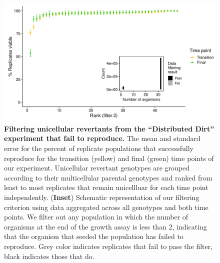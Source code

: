 \documentclass[
]{book}
\begin{document}
\begin{figure}
\centering
\includegraphics{images/Figure_S12_Dist_dirt_Populations_that_fail_to_divide_NEW_14MAR23.png}
\caption{\label{fig:dd-filter-2-failure-to-divide}\textbf{Filtering unicellular revertants from the ``Distributed Dirt'' experiment that fail to reproduce.} The mean and standard error for the percent of replicate populations that successfully reproduce for the transition (yellow) and final (green) time points of our experiment. Unicellular revertant genotypes are grouped according to their multicellular parental genotypes and ranked from least to most replicates that remain unicellluar for each time point independently. (\textbf{Inset}) Schematic representation of our filtering criterion using data aggregated across all genotypes and both time points. We filter out any population in which the number of organisms at the end of the growth assay is less than 2, indicating that the organism that seeded the population has failed to reproduce. Grey color indicates replicates that fail to pass the filter, black indicates those that do.}
\end{figure}
\end{document}
